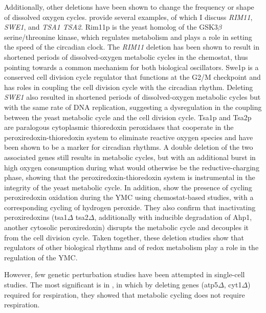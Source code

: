 Additionally, other deletions have been shown to change the frequency or shape of dissolved oxygen cycles.
\textcite{caustonMetabolicCyclesYeast2015} provide several examples, of which I discuss \emph{RIM11}, \emph{SWE1}, and \emph{TSA1 TSA2}. %
Rim11p is the yeast homolog of the GSK3$\beta$ serine/threonine kinase, which regulates metabolism and plays a role in setting the speed of the circadian clock.
The \emph{RIM11} deletion has been shown to result in shortened periods of dissolved-oxygen metabolic cycles in the chemostat, thus pointing towards a common mechanism for both biological oscillators.
Swe1p is a conserved cell division cycle regulator that functions at the G2/M checkpoint and has roles in coupling the cell division cycle with the circadian rhythm.
Deleting \emph{SWE1} also resulted in shortened periods of dissolved-oxygen metabolic cycles but with the same rate of DNA replication, suggesting a dysregulation in the coupling between the yeast metabolic cycle and the cell division cycle.
Tsa1p and Tsa2p are paralogous cytoplasmic thioredoxin peroxidases that cooperate in the peroxiredoxin-thioredoxin system to eliminate reactive oxygen species and have been shown to be a marker for circadian rhythms.
A double deletion of the two associated genes still results in metabolic cycles, but with an additional burst in high oxygen consumption during what would otherwise be the reductive-charging phase, showing that the peroxiredoxin-thioredoxin system is instrumental in the integrity of the yeast metabolic cycle.
In addition, \textcite{amponsahPeroxiredoxinsCoupleMetabolism2021} show the presence of cycling peroxiredoxin oxidation during the YMC using chemostat-based studies, with a corresponding cycling of hydrogen peroxide.
They also confirm that inactivating peroxiredoxins (tsa1$\Delta$ tsa2$\Delta$, additionally with inducible degradation of Ahp1, another cytosolic peroxiredoxin) disrupts the metabolic cycle and decouples it from the cell division cycle.
Taken together, these deletion studies show that regulators of other biological rhythms and of redox metabolism play a role in the regulation of the YMC.

However, few genetic perturbation studies have been attempted in single-cell studies.
The most significant is in \textcite{baumgartnerFlavinbasedMetabolicCycles2018}, in which by deleting genes (atp5$\Delta$, cyt1$\Delta$) required for respiration, they showed that metabolic cycling does not require respiration.

